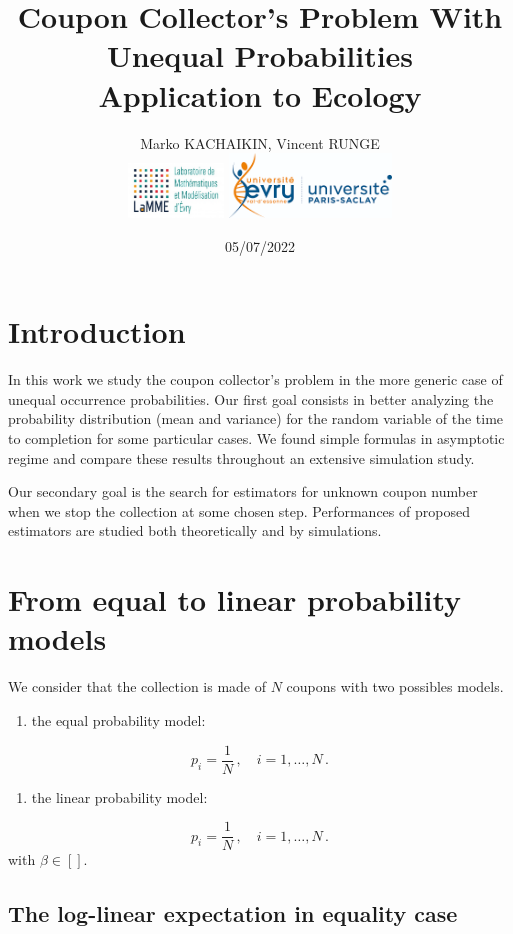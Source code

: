 \documentclass[
]{article}
\title{Coupon Collector's Problem With Unequal Probabilities\\
\textbf{Application to Ecology}}
\author{Marko KACHAIKIN, Vincent RUNGE\\
\includegraphics[width=1in,height=\textheight]{logo_lamme.png}
\includegraphics[width=1.7in,height=\textheight]{logo_UEVE.png}}
\date{05/07/2022}
\providecommand{\tightlist}{%
  \setlength{\itemsep}{0pt}\setlength{\parskip}{0pt}}
\begin{document}
\maketitle

{
\hypersetup{linkcolor=}
\setcounter{tocdepth}{2}
\tableofcontents
}
\noindent\hrulefill

\hypertarget{introduction}{%
\section{Introduction}\label{introduction}}

In this work we study the coupon collector's problem in the more generic
case of unequal occurrence probabilities. Our first goal consists in
better analyzing the probability distribution (mean and variance) for
the random variable of the time to completion for some particular cases.
We found simple formulas in asymptotic regime and compare these results
throughout an extensive simulation study.

Our secondary goal is the search for estimators for unknown coupon
number when we stop the collection at some chosen step. Performances of
proposed estimators are studied both theoretically and by simulations.

\hypertarget{from-equal-to-linear-probability-models}{%
\section{From equal to linear probability
models}\label{from-equal-to-linear-probability-models}}

We consider that the collection is made of \(N\) coupons with two
possibles models.

\begin{enumerate}
\def\labelenumi{\arabic{enumi}.}
\tightlist
\item
  the equal probability model:
\end{enumerate}

\[p_i = \frac{1}{N}\,,\quad i = 1,\ldots, N\,.\]

\begin{enumerate}
\def\labelenumi{\arabic{enumi}.}
\setcounter{enumi}{1}
\tightlist
\item
  the linear probability model:
\end{enumerate}

\[p_i = \frac{1}{N}\,,\quad i = 1,\ldots, N\,.\] with \(\beta \in []\).

\hypertarget{the-log-linear-expectation-in-equality-case}{%
\subsection{The log-linear expectation in equality
case}\label{the-log-linear-expectation-in-equality-case}}
\end{document}

